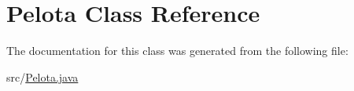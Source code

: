 \hypertarget{classPelota}{\section{Pelota Class Reference}
\label{classPelota}
}


The documentation for this class was generated from the following file\-:\begin{DoxyCompactItemize}
\item 
src/\hyperlink{Pelota_8java}{Pelota.\-java}\end{DoxyCompactItemize}

